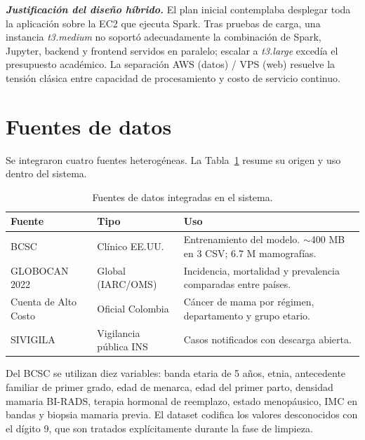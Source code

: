 \documentclass[conference,a4paper,10pt]{IEEEtran}
\newcommand{\code}[1]{{\ttfamily\small\textcolor{hai-primary-dark}{#1}}}
\begin{document}
\begin{callout}
\textbf{\itshape Justificación del diseño híbrido.} El plan inicial
contemplaba desplegar toda la aplicación sobre la EC2 que ejecuta Spark.
Tras pruebas de carga, una instancia \emph{t3.medium} no soportó
adecuadamente la combinación de Spark, Jupyter, backend y frontend
servidos en paralelo; escalar a \emph{t3.large} excedía el presupuesto
académico. La separación AWS (datos) / VPS (web) resuelve la tensión
clásica entre capacidad de procesamiento y costo de servicio continuo.
\end{callout}

\section{Fuentes de datos}\label{sec:fuentes}
Se integraron cuatro fuentes heterogéneas. La Tabla~\ref{tab:fuentes}
resume su origen y uso dentro del sistema.

\begin{table}[!t]
\caption{Fuentes de datos integradas en el sistema.}
\label{tab:fuentes}
\centering
\renewcommand{\arraystretch}{1.15}
\begin{tabularx}{\columnwidth}{@{}l l X@{}}
\toprule
\rowcolor{hai-primary-soft}
\textbf{\color{hai-primary-dark}Fuente} &
\textbf{\color{hai-primary-dark}Tipo} &
\textbf{\color{hai-primary-dark}Uso} \\
\midrule
BCSC~\cite{bcsc}             & Clínico EE.UU.   & Entrenamiento del modelo. $\sim$400 MB en 3 CSV; 6.7 M mamografías. \\
GLOBOCAN 2022~\cite{globocan} & Global (IARC/OMS) & Incidencia, mortalidad y prevalencia comparadas entre países. \\
Cuenta de Alto Costo~\cite{cac} & Oficial Colombia & Cáncer de mama por régimen, departamento y grupo etario. \\
SIVIGILA~\cite{sivigila}    & Vigilancia pública INS & Casos notificados con descarga abierta. \\
\bottomrule
\end{tabularx}
\end{table}

Del BCSC se utilizan diez variables: banda etaria de 5 años, etnia,
antecedente familiar de primer grado, edad de menarca, edad del primer
parto, densidad mamaria BI-RADS, terapia hormonal de reemplazo, estado
menopáusico, IMC en bandas y biopsia mamaria previa. El dataset codifica
los valores desconocidos con el dígito \code{9}, que son tratados
explícitamente durante la fase de limpieza.
\end{document}
